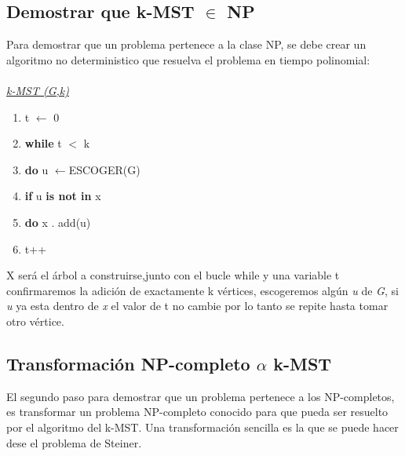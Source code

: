 \documentclass[spanish,12pt]{elsarticle}
\newcommand{\blank}[1]{\hspace*{#1}}
\begin{document}
\subsection{Demostrar que k-MST $\in$ NP}
Para demostrar que un problema pertenece a la clase NP, se debe crear un algoritmo no deterministico que resuelva el problema en tiempo polinomial:\\\\
\clearpage
\textit{\underline{k-MST (G,k)} }
\begin{enumerate}


    \item  \textnormal{t $\leftarrow$ 0}
    \item  \textnormal{\textbf{while} t $<$ k}
    \item \textnormal{\blank{1cm}\textbf{do} u $\leftarrow${ESCOGER(G)}}
    \item  \textnormal{\blank{2cm}\textbf{if} u \textbf{is not in} x}
    \item \textnormal{\blank{3cm}\textbf{do} x . add(u)}
     \item \textnormal{\blank{3cm} t++}\\
\end{enumerate}
X será el árbol a construirse,junto con el bucle while y una variable t confirmaremos la adición de  exactamente k vértices, escogeremos algún \textit{u} de \textit{G}, si \textit{u} ya esta dentro de \textit{x} el valor de t no cambie por lo tanto se repite hasta tomar otro vértice.


\subsection{Transformación NP-completo $\alpha$  k-MST}
El segundo paso para demostrar que un problema pertenece a los NP-completos, es transformar un problema NP-completo conocido para que pueda ser resuelto por el algoritmo del k-MST. Una transformación sencilla es la que se puede hacer dese el problema de Steiner.
\end{document}
